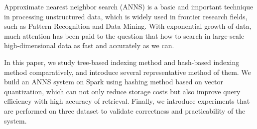 \begin{eabstract}
   Approximate nearest neighbor search (ANNS) is a basic and important technique
   in processing unstructured data, which is widely used in frontier research fields,
   such as Pattern Recognition and Data Mining. With exponential growth of data, much
   attention has been paid to the question that how to search in large-scale
   high-dimensional data as fast and accurately as we can.

   In this paper, we study tree-based indexing method and hash-based indexing
   method comparatively, and introduce several representative method of them. We build
   an ANNS system on Spark using hashing method based on vector quantization, which can
   not only reduce storage costs but also improve query efficiency with high accuracy of retrieval. Finally, we introduce
   experiments that are performed on three dataset to validate correctness and practicability
   of the system.
\end{eabstract}


